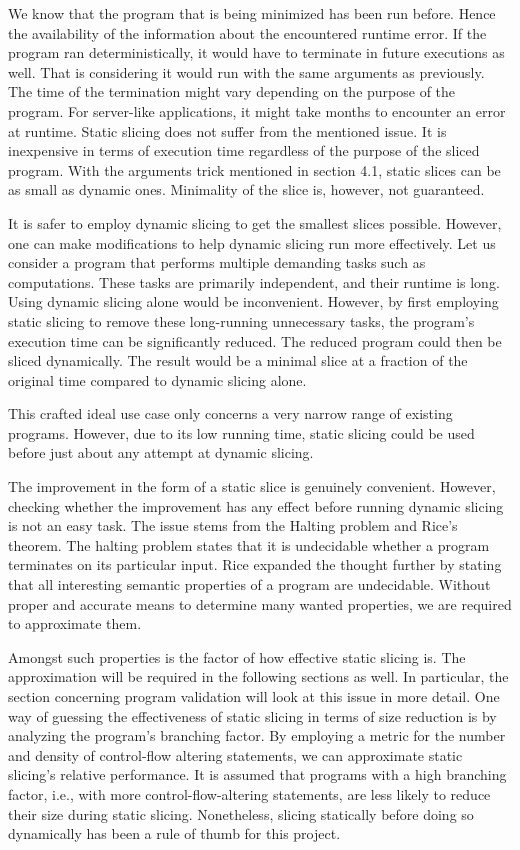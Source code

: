 We know that the program that is being minimized has been run before.
Hence the availability of the information about the encountered runtime 
error.
If the program ran deterministically, it would have to terminate in future 
executions as well.
That is considering it would run with the same arguments as previously.
The time of the termination might vary depending on the purpose of 
the program.
For server-like applications, it might take months to encounter an error 
at runtime.
Static slicing does not suffer from the mentioned issue.
It is inexpensive in terms of execution time regardless of the purpose 
of the sliced program.
With the arguments trick mentioned in section 4.1, static slices can be 
as small as dynamic ones.
Minimality of the slice is, however, not guaranteed.

It is safer to employ dynamic slicing to get the smallest slices possible.
However, one can make modifications to help dynamic slicing run more 
effectively.
Let us consider a program that performs multiple demanding tasks 
such as computations.
These tasks are primarily independent, and their runtime is long.
Using dynamic slicing alone would be inconvenient.
However, by first employing static slicing to remove these long-running 
unnecessary tasks, the program's execution time can be significantly reduced.
The reduced program could then be sliced dynamically.
The result would be a minimal slice at a fraction of the original time 
compared to dynamic slicing alone.

This crafted ideal use case only concerns a very narrow range of existing 
programs.
However, due to its low running time, static slicing could be used before 
just about any attempt at dynamic slicing.


The improvement in the form of a static slice is genuinely convenient.
However, checking whether the improvement has any effect before running 
dynamic slicing is not an easy task.
The issue stems from the Halting problem and Rice's theorem.
The halting problem states that it is undecidable whether a program 
terminates on its particular input.
Rice expanded the thought further by stating that all interesting semantic 
properties of a program are undecidable.
Without proper and accurate means to determine many wanted properties, 
we are required to approximate them.

Amongst such properties is the factor of how effective static slicing is.
The approximation will be required in the following sections as well.
In particular, the section concerning program validation will look at this 
issue in more detail.
One way of guessing the effectiveness of static slicing in terms of size 
reduction is by analyzing the program's branching factor.
By employing a metric for the number and density of control-flow altering 
statements, we can approximate static slicing's relative performance.
It is assumed that programs with a high branching factor, i.e., with more 
control-flow-altering statements, are less likely to reduce their size 
during static slicing.
Nonetheless, slicing statically before doing so dynamically has been 
a rule of thumb for this project.

